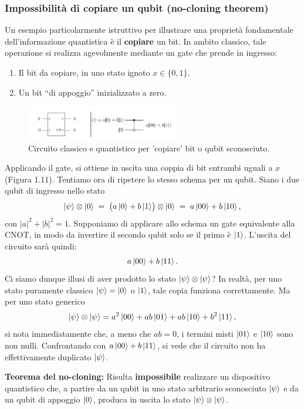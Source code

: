 \documentclass[a4paper,12pt]{report}
\theoremstyle{plain}
\begin{document}
\subsubsection{Impossibilità di copiare un qubit (no-cloning theorem)}
Un esempio particolarmente istruttivo per illustrare una proprietà fondamentale dell'informazione quantistica è il \textbf{copiare} un bit. In ambito classico, tale operazione si realizza agevolmente mediante un gate che prende in ingresso:
\begin{enumerate}
    \item Il bit da copiare, in uno stato ignoto $x\in\{0,1\}$.
    \item Un bit ``di appoggio'' inizializzato a zero.
\end{enumerate}
\begin{figure}[H]
    \centering
    \includegraphics[width=0.6\textwidth]{Immagine11.png} 
    \caption{Circuito classico e quantistico per 'copiare' bit o qubit sconosciuto.}
    \label{Immagine11}
\end{figure}
Applicando il gate, si ottiene in uscita una coppia di bit entrambi uguali a $x$ (Figura 1.11).
Tentiamo ora di ripetere lo stesso schema per un qubit. Siano i due qubit di ingresso nello stato
\begin{equation}
\ket{\psi}\otimes\ket{0}
\;=\;
\bigl(a\ket{0} + b\ket{1}\bigr)\otimes \ket{0}
\;=\;
a\ket{00} + b\ket{10},
\end{equation}
con $\lvert a\rvert^2 + \lvert b\rvert^2 = 1$. Supponiamo di applicare allo schema un gate equivalente alla CNOT, in modo da invertire il secondo qubit solo se il primo è $\ket{1}$. L'uscita del circuito sarà quindi:
\[
a\ket{00} + b\ket{11}.
\]
Ci siamo dunque illusi di aver prodotto lo stato $\ket{\psi}\otimes\ket{\psi}$? In realtà, per uno stato puramente classico $\ket{\psi}=\ket{0}$ o $\ket{1}$, tale copia funziona correttamente. Ma per uno stato generico
\begin{equation}
\ket{\psi}\otimes\ket{\psi}
= a^2\ket{00}
+ ab\ket{01}
+ ab\ket{10}
+ b^2\ket{11},
\end{equation}
si nota immediatamente che, a meno che $ab=0$, i termini misti $\ket{01}$ e $\ket{10}$ sono non nulli. Confrontando con $a\ket{00} + b\ket{11}$, si vede che il circuito non ha effettivamente duplicato $\ket{\psi}$.
\begin{tcolorbox}[colback=white,colframe=black,arc=0mm,boxsep=5pt,left=5pt,right=5pt,top=3pt,bottom=3pt]
\textbf{Teorema del no-cloning:} Risulta \textbf{impossibile} realizzare un dispositivo quantistico che, a partire da un qubit in uno stato arbitrario sconosciuto $\ket{\psi}$ e da un qubit di appoggio $\ket{0}$, produca in uscita lo stato $\ket{\psi}\otimes\ket{\psi}$.
\end{tcolorbox}
\end{document}
